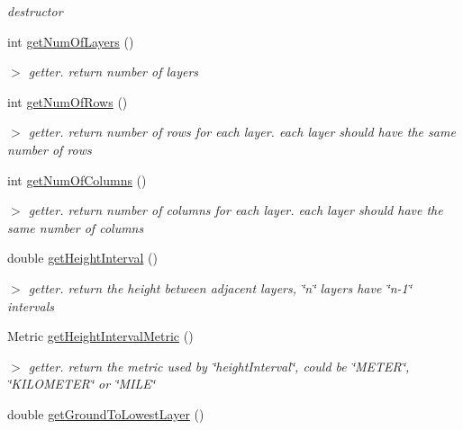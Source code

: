 \begin{DoxyCompactItemize}
\begin{DoxyCompactList}\small\item\em destructor \end{DoxyCompactList}\item 
int \hyperlink{classGridLayer_a692d934e688b38feafbd8e80d301a596}{get\-Num\-Of\-Layers} ()
\begin{DoxyCompactList}\small\item\em $>$ getter. return number of layers \end{DoxyCompactList}\item 
int \hyperlink{classGridLayer_adbb8ed986a96063e3c986fb474db2ad7}{get\-Num\-Of\-Rows} ()
\begin{DoxyCompactList}\small\item\em $>$ getter. return number of rows for each layer. each layer should have the same number of rows \end{DoxyCompactList}\item 
int \hyperlink{classGridLayer_aafa4cad0c7572dd5df051daaa6480b52}{get\-Num\-Of\-Columns} ()
\begin{DoxyCompactList}\small\item\em $>$ getter. return number of columns for each layer. each layer should have the same number of columns \end{DoxyCompactList}\item 
double \hyperlink{classGridLayer_ab18678e9be40fe08e34002b24e4541a8}{get\-Height\-Interval} ()
\begin{DoxyCompactList}\small\item\em $>$ getter. return the height between adjacent layers, \char`\"{}n\char`\"{} layers have \char`\"{}n-\/1\char`\"{} intervals \end{DoxyCompactList}\item 
\hypertarget{classGridLayer_a5c00efe20cc10be6479381f1855e459b}{\-Metric \hyperlink{classGridLayer_a5c00efe20cc10be6479381f1855e459b}{get\-Height\-Interval\-Metric} ()}\label{classGridLayer_a5c00efe20cc10be6479381f1855e459b}

\begin{DoxyCompactList}\small\item\em $>$ getter. return the metric used by \char`\"{}height\-Interval\char`\"{}, could be \char`\"{}\-M\-E\-T\-E\-R\char`\"{}, \char`\"{}\-K\-I\-L\-O\-M\-E\-T\-E\-R\char`\"{} or \char`\"{}\-M\-I\-L\-E\char`\"{} \end{DoxyCompactList}\item 
\hypertarget{classGridLayer_a7b190d6edef6697c3fe1b2bf6cbee639}{double \hyperlink{classGridLayer_a7b190d6edef6697c3fe1b2bf6cbee639}{get\-Ground\-To\-Lowest\-Layer} ()}\label{classGridLayer_a7b190d6edef6697c3fe1b2bf6cbee639}


\end{DoxyCompactItemize}
